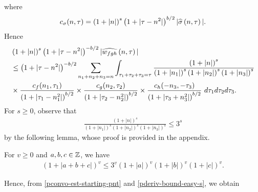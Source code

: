 %
%
where 
%
%
\begin{equation*}
  \begin{split}
    c_\sigma(n, \tau) = \left (1 + |n| \right ) ^s \left( 1 + | \tau - n^{2} |  
    \right)^{b/2} | \widehat{\sigma}\left( n, \tau \right) | .
  \end{split}
\end{equation*}
%
%
Hence
%
%
\begin{equation}
  \label{pconvo-est-starting-pnt}
  \begin{split}
     & \left (1 + |n| \right )^s \left( 1 + | \tau - n^{2} | \right)^{-b/2} | \widehat{{w}_{fgh}}\left( 
    n, \tau \right) |
    \\
    & \le \left( 1 + | \tau - n^{2} | \right)^{-b/2}
    \sum_{n_1 + n_2 + n_3 = n} \int_{\tau_1 + \tau_2 + \tau_3 = \tau} \frac{\left (1 + |n| \right )^s}{\left (1 +
    |n_1| \right )^s \left (1 + | n_2| \right )^s \left (1 + |n_3| \right )^s} 
    \\
    & \times \frac{c_f(n_1, \tau_1)}{\left( 1 + | \tau_1 - n_1^2 | 
    \right)^{b/2}}
    \times
    \frac{c_g(n_2, \tau_2)}{\left( 1 + | \tau_2 - n_2^2 | 
    \right)^{b/2}} \times
    \frac{c_h(-n_3, -\tau_3)}{\left( 1 + | \tau_3 + n_3^2 | 
    \right)^{b/2}}\ d \tau_1 d \tau_2 d \tau_3.
  \end{split}
\end{equation}
%
%
For $s \ge 0$, observe that
%
%
\begin{equation}
  \label{pderiv-bound-easy-s}
  \begin{split}
    \frac{\left (1 + |n| \right ) ^s}{\left (1 + |n_1| \right ) ^s \left (1 + |n_2| \right ) ^s \left (1 + |n_3| \right ) ^s} 
    \le 3^{s}
  \end{split}
\end{equation}
%
%
by the following lemma, whose proof is provided in the appendix.
%
%
\begin{lemma}
\label{plem:splitting}
  For $v \ge 0$ and $a, b, c \in \mathbb{Z}$, we have
%
%
\begin{equation}
  \label{psplitting}
  \begin{split}
    \left ( 1 + |a +b + c| \right)^v \le 3^v \left(1 + | a | \right)^v \left(
    1 + | b | \right)^v \left( 1 + | c | \right)^v.
  \end{split}
\end{equation}
%
%
\end{lemma}
%
%
Hence, from \eqref{pconvo-est-starting-pnt} and \eqref{pderiv-bound-easy-s}, we 
obtain
%
